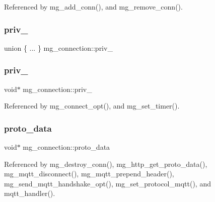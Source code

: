 Referenced by mg\+\_\+add\+\_\+conn(), and mg\+\_\+remove\+\_\+conn().

\mbox{\label{structmg__connection_ad4386d39d9feedc547a1b1fcc8c5c7de_ad4386d39d9feedc547a1b1fcc8c5c7de}} 
\subsubsection{\texorpdfstring{priv\+\_}{priv\_1}}
{\footnotesize\ttfamily union \{ ... \}   mg\+\_\+connection\+::priv\+\_}

\mbox{\label{structmg__connection_aeb5efea496ac74ed2e0b8864f4fd6f65_aeb5efea496ac74ed2e0b8864f4fd6f65}} 
\subsubsection{\texorpdfstring{priv\+\_}{priv\_2}}
{\footnotesize\ttfamily void$\ast$ mg\+\_\+connection\+::priv\+\_}



Referenced by mg\+\_\+connect\+\_\+opt(), and mg\+\_\+set\+\_\+timer().

\mbox{\label{structmg__connection_a7508851a3c070a1357c226781fa92bb7_a7508851a3c070a1357c226781fa92bb7}} 
\subsubsection{\texorpdfstring{proto\+\_\+data}{proto\_data}}
{\footnotesize\ttfamily void$\ast$ mg\+\_\+connection\+::proto\+\_\+data}



Referenced by mg\+\_\+destroy\+\_\+conn(), mg\+\_\+http\+\_\+get\+\_\+proto\+\_\+data(), mg\+\_\+mqtt\+\_\+disconnect(), mg\+\_\+mqtt\+\_\+prepend\+\_\+header(), mg\+\_\+send\+\_\+mqtt\+\_\+handshake\+\_\+opt(), mg\+\_\+set\+\_\+protocol\+\_\+mqtt(), and mqtt\+\_\+handler().

